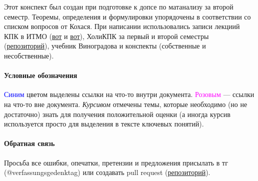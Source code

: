 
Этот конспект был создан при подготовке к допсе по матанализу за второй семестр. Теоремы, определения и формулировки упорядочены в соответствии со списком вопросов от Кохася. При написании использовались записи лекциий КПК в ИТМО (\href{https://youtube.com/playlist?list=PLd7QXkfmSY7avIqoacyLFhwAAfO-JQX7w&si=zLviQ8XKvk3Mrje3}{вот} и \href{https://youtube.com/playlist?list=PLd7QXkfmSY7YppM1nXNRKzXeQN0TYfFBQ&si=TGkLA1tfMZIdTC02}{вот}), ХолиКПК за первый и второй семестры (\href{https://github.com/snitron/ct-itmo}{репозиторий}), учебник Виноградова и конспекты (собственные и несобственные).

\paragraph{Условные обозначения}

\textcolor{blue}{Синим} цветом выделены ссылки на что-то внутри документа. \textcolor{magenta}{Розовым} --- ссылки на что-то вне документа. \textit{Курсивом} отмечены темы, которые необходимо (но не достаточно) знать для получения положительной оценки (а иногда курсив используется просто для выделения в тексте ключевых понятий).

\paragraph{Обратная связь} Просьба все ошибки, опечатки, претензии и предложения присылать в тг (@verfassungsgedenktag) или создавать pull request (\href{https://github.com/verfassungsgedenktag/kpk}{репозиторий}).